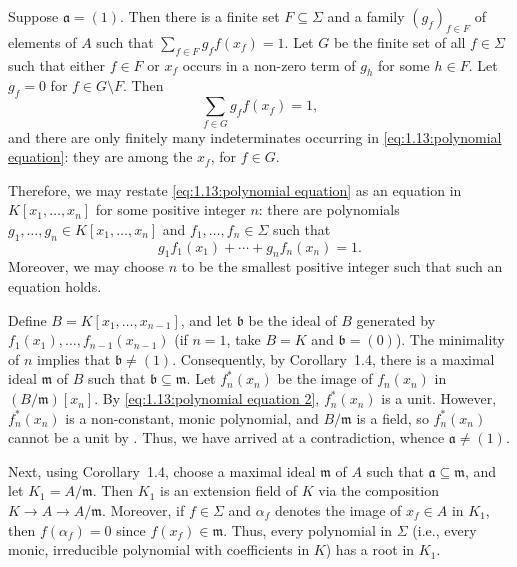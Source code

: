 \begin{solution}
Suppose \(\mathfrak{a} = (1)\).
Then there is a finite set \(F \subseteq \Sigma\) and a family \((g_f)_{f \in F}\) of elements of \(A\) such that \(\sum_{f \in F} g_f f(x_f) = 1\).
Let \(G\) be the finite set of all \(f \in \Sigma\) such that either \(f \in F\) or \(x_f\) occurs in a non-zero term of \(g_h\) for some \(h \in F\).
Let \(g_f = 0\) for \(f \in G \setminus F\).
Then
\begin{equation}
\label{eq:1.13:polynomial equation}
\sum_{f \in G} g_f f(x_f) = 1,
\end{equation}
and there are only finitely many indeterminates occurring in \eqref{eq:1.13:polynomial equation}: they are among the \(x_f\), for \(f \in G\).

Therefore, we may restate \eqref{eq:1.13:polynomial equation} as an equation in \(K[x_1, \ldots, x_n]\) for some positive integer \(n\): there are polynomials \(g_1, \ldots, g_n \in K[x_1, \ldots, x_n]\) and \(f_1, \ldots, f_n \in \Sigma\) such that
\begin{equation}
\label{eq:1.13:polynomial equation 2}
g_1 f_1(x_1) + \cdots + g_n f_n(x_n) = 1.
\end{equation}
Moreover, we may choose \(n\) to be the smallest positive integer such that such an equation holds.

Define \(B = K[x_1, \ldots, x_{n - 1}]\), and let \(\mathfrak{b}\) be the ideal of \(B\) generated by \(f_1(x_1), \ldots, f_{n - 1}(x_{n - 1})\) (if \(n = 1\), take \(B = K\) and \(\mathfrak{b} = (0)\)).
The minimality of \(n\) implies that \(\mathfrak{b} \neq (1)\).
Consequently, by Corollary~1.4, there is a maximal ideal \(\mathfrak{m}\) of \(B\) such that \(\mathfrak{b} \subseteq \mathfrak{m}\).
Let \(f_n^*(x_n)\) be the image of \(f_n(x_n)\) in \((B / \mathfrak{m})[x_n]\).
By \eqref{eq:1.13:polynomial equation 2}, \(f_n^*(x_n)\) is a unit.
However, \(f_n^*(x_n)\) is a non-constant, monic polynomial, and \(B / \mathfrak{m}\) is a field, so \(f_n^*(x_n)\) cannot be a unit by .
Thus, we have arrived at a contradiction, whence \(\mathfrak{a} \neq (1)\).

Next, using Corollary~1.4, choose a maximal ideal \(\mathfrak{m}\) of \(A\) such that \(\mathfrak{a} \subseteq \mathfrak{m}\), and let \(K_1 = A / \mathfrak{m}\).
Then \(K_1\) is an extension field of \(K\) via the composition \(K \to A \to A / \mathfrak{m}\).
Moreover, if \(f \in \Sigma\) and \(\alpha_f\) denotes the image of \(x_f \in A\) in \(K_1\), then \(f(\alpha_f) = 0\) since \(f(x_f) \in \mathfrak{m}\).
Thus, every polynomial in \(\Sigma\) (i.e., every monic, irreducible polynomial with coefficients in \(K\)) has a root in \(K_1\).


\end{solution}
